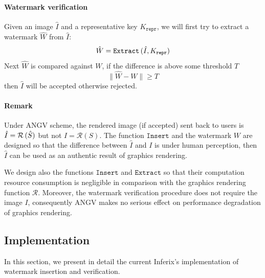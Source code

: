 \documentclass[a4paper,11pt,onecolumn]{memoir}
\begin{document}
\paragraph[Watermark verification]{Watermark verification}
Given an image $\hat{I}$ and a representative key $K_{\mathtt{repr}}$, we will first try to extract a watermark $\hat{W}$ from $\hat{I}$:
\begin{equation*}
    \hat{W} = \mathtt{Extract} \thinspace (\hat{I}, K_{\mathtt{repr}})
\end{equation*}
Next $\hat{W}$ is compared against $W$, if the difference is above some threshold $T$
\begin{equation*}
    \lVert \hat{W} - W \rVert \geq T
\end{equation*}
then $\hat{I}$ will be accepted otherwise rejected.

\paragraph[Remark]{Remark}
Under ANGV scheme, the rendered image (if accepted) sent back to users is $\hat{I} = \mathcal{R}\thinspace(\hat{S})$ but not $I = \mathcal{R}\left(S\right)$. The function $\mathtt{Insert}$ and the watermark $W$ are designed so that the difference between $\hat{I}$ and $I$ is under human perception, then $\hat{I}$ can be used as an authentic result of graphics rendering.

We design also the functions $\mathtt{Insert}$ and $\mathtt{Extract}$ so that their computation resource consumption is negligible in comparison with the graphics rendering function $\mathcal{R}$. Moreover, the watermark verification procedure does not require the image $I$, consequently ANGV makes no serious effect on performance degradation of graphics rendering.
 

\subsection[Implementation]{Implementation}
In this section, we present in detail the current Inferix's implementation of watermark insertion and verification.

\end{document}
